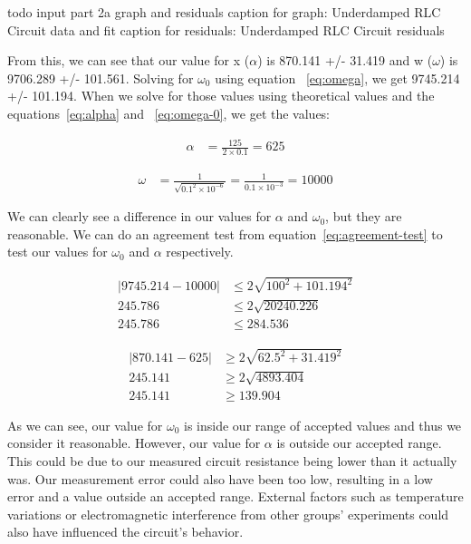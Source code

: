 \documentclass[11pt]{article}
\begin{document}
    todo input part 2a graph and residuals
    caption for graph: Underdamped RLC Circuit data and fit
    caption for residuals: Underdamped RLC Circuit residuals

    From this, we can see that our value for x (\( \alpha \)) is 870.141 +/- 31.419 and w (\( \omega \)) is 9706.289 +/- 101.561. Solving for \( \omega_0 \) using equation ~\ref{eq:omega}, we get 9745.214 +/- 101.194. When we solve for those values using theoretical values and the equations~\ref{eq:alpha} and ~\ref{eq:omega-0}, we get the values:

    \begin{align*}
        \alpha &= \frac{125}{2 \times 0.1} = 625
    \end{align*}

    \begin{align*}
        \omega &= \frac{1}{\sqrt{0.1^2 \times 10^{-6}}} = \frac{1}{0.1 \times 10^{-3}} = 10000
    \end{align*}

    We can clearly see a difference in our values for \( \alpha \) and \( \omega_0 \), but they are reasonable. We can do an agreement test from equation~\ref{eq:agreement-test} to test our values for \( \omega_0 \) and \( \alpha \) respectively.

    \begin{e}
        \begin{align*}
            |9745.214 - 10000| &\le 2 \sqrt{100^2 + 101.194^2} \\
            245.786 &\le 2 \sqrt{20240.226} \\
            245.786 &\le 284.536
        \end{align*}
    \end{e}
    \begin{e}
        \begin{align*}
            |870.141 - 625| &\ge 2 \sqrt{62.5^2 + 31.419^2} \\
            245.141 &\ge 2 \sqrt{4893.404} \\
            245.141 &\ge 139.904
        \end{align*}
    \end{e}

    As we can see, our value for \( \omega_0 \) is inside our range of accepted values and thus we consider it reasonable. However, our value for \( \alpha \) is outside our accepted range. This could be due to our measured circuit resistance being lower than it actually was. Our measurement error could also have been too low, resulting in a low error and a value outside an accepted range. External factors such as temperature variations or electromagnetic interference from other groups' experiments could also have influenced the circuit's behavior.
\end{document}
